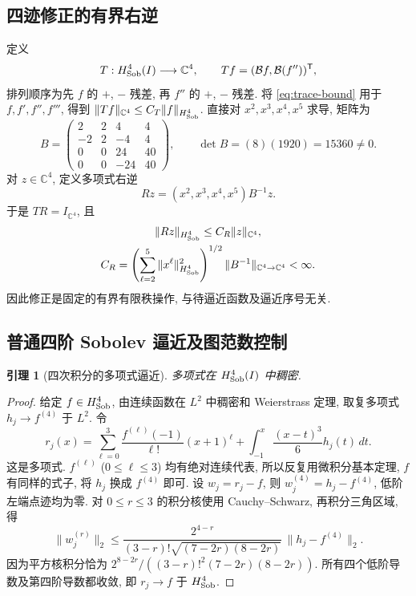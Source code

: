 \documentclass[UTF8]{ctexart}
\newtheorem{lemma}[theorem]{引理}
\begin{document}
\subsection{四迹修正的有界右逆}
定义
\[
 T:H^4_{\rm Sob}(I)\longrightarrow\mathbb C^4,\qquad
 Tf=(\mathcal Bf,\mathcal B(f''))^{\mathsf T},
\]
排列顺序为先 $f$ 的 $+$, $-$ 残差, 再 $f''$ 的 $+$, $-$ 残差.
将 \eqref{eq:trace-bound} 用于 $f,f',f'',f'''$,
得到 $\|Tf\|_{\mathbb C^4}\le C_T\|f\|_{H^4_{\rm Sob}}$.
直接对 $x^2,x^3,x^4,x^5$ 求导, 矩阵为
\begin{equation}\label{eq:four-trace-matrix}
 B=\begin{pmatrix}
 2&2&4&4\\
 -2&2&-4&4\\
 0&0&24&40\\
 0&0&-24&40
 \end{pmatrix},\qquad
 \det B=(8)(1920)=15360\ne0.
\end{equation}
对 $z\in\mathbb C^4$, 定义多项式右逆
\[
 Rz=(x^2,x^3,x^4,x^5)B^{-1}z.
\]
于是 $TR=I_{\mathbb C^4}$, 且
\[
 \begin{gathered}
 \|Rz\|_{H^4_{\rm Sob}}\le C_R\|z\|_{\mathbb C^4},\\
 C_R=\left(\sum_{\ell=2}^5\|x^\ell\|_{H^4_{\rm Sob}}^2\right)^{1/2}
          \|B^{-1}\|_{\mathbb C^4\to\mathbb C^4}<\infty.
 \end{gathered}
\]
因此修正是固定的有界有限秩操作, 与待逼近函数及逼近序号无关.

\subsection{普通四阶 Sobolev 逼近及图范数控制}
\begin{lemma}[四次积分的多项式逼近]\label{lem:h4-approximation}
多项式在 $H^4_{\rm Sob}(I)$ 中稠密.
\end{lemma}
\begin{proof}
给定 $f\in H^4_{\rm Sob}$, 由连续函数在 $L^2$ 中稠密和 Weierstrass 定理,
取复多项式 $h_j\to f^{(4)}$ 于 $L^2$. 令
\[
 r_j(x)=\sum_{\ell=0}^3\frac{f^{(\ell)}(-1)}{\ell!}(x+1)^\ell
       +\int_{-1}^x\frac{(x-t)^3}{6}h_j(t)\,dt.
\]
这是多项式. $f^{(\ell)}$ ($0\le\ell\le3$) 均有绝对连续代表,
所以反复用微积分基本定理, $f$ 有同样的式子, 将 $h_j$ 换成 $f^{(4)}$ 即可.
设 $w_j=r_j-f$, 则 $w_j^{(4)}=h_j-f^{(4)}$, 低阶左端点迹均为零.
对 $0\le r\le3$ 的积分核使用 Cauchy--Schwarz, 再积分三角区域, 得
\[
 \|w_j^{(r)}\|_2\le
 \frac{2^{4-r}}{(3-r)!\sqrt{(7-2r)(8-2r)}}\,\|h_j-f^{(4)}\|_2.
\]
因为平方核积分恰为
$2^{8-2r}/((3-r)!^2(7-2r)(8-2r))$.
所有四个低阶导数及第四阶导数都收敛, 即 $r_j\to f$ 于 $H^4_{\rm Sob}$.
\end{proof}
\end{document}
